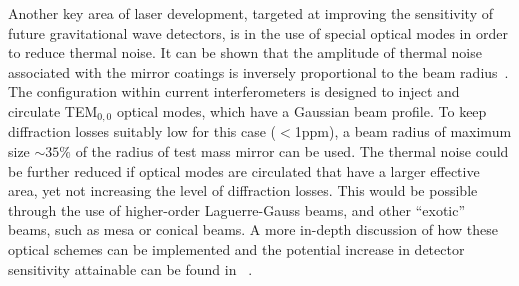 \documentclass{article}
\begin{document}
%
%

Another key area of laser development, targeted at improving the sensitivity of
future gravitational wave detectors, is in the use of special optical modes in
order to reduce thermal noise. It can be shown that the amplitude of thermal
noise associated with the mirror coatings is inversely proportional to the beam
radius~\cite{Nakagawa:2002}. The configuration within current interferometers is
designed to inject and circulate TEM$_{0,0}$ optical modes, which have a
Gaussian beam profile.  To keep diffraction losses suitably low for this case
($<$1ppm), a beam radius of maximum size $\sim35\%$ of the radius of test mass
mirror can be used. The thermal noise could be further reduced if optical modes
are circulated that have a larger effective area, yet not increasing the level
of diffraction losses. This would be possible through the use of higher-order
Laguerre-Gauss beams, and other ``exotic'' beams, such as mesa or conical beams.
A more in-depth discussion of how these optical schemes can be implemented and
the potential increase in detector sensitivity attainable can be found in
~\cite{Vinet:2009}.
\end{document}
